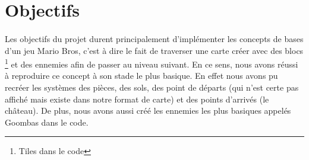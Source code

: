 \section{Objectifs}

\paragraph{} Les objectifs du projet durent principalement d'implémenter les concepts de bases d'un jeu Mario Bros, c'est à dire le fait de traverser une carte créer avec des blocs \footnote{Tiles dans le code} et des ennemies afin de passer au niveau suivant. En ce sens, nous avons réussi à reproduire ce concept à son stade le plus basique. En effet nous avons pu recréer les systèmes des pièces, des sols, des point de départs (qui n'est certe pas affiché mais existe dans notre format de carte) et des points d'arrivés (le château). De plus, nous avons aussi créé les ennemies les plus basiques appelés Goombas dans le code.


